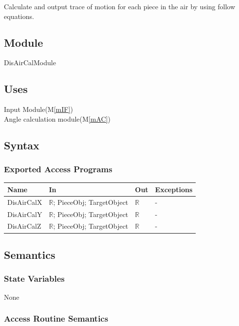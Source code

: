 \documentclass[12pt, titlepage]{article}
\newcommand{\mref}[1]{M\ref{#1}}
\begin{document}
Calculate and output trace of motion for each piece in the air by using follow equations.\\

\subsection{Module}

DisAirCalModule

\subsection{Uses}

Input Module(\mref{mIF})\\
Angle calculation module(\mref{mAC})\\

\subsection{Syntax}

\subsubsection{Exported Access Programs}

\begin{center}
	\begin{tabular}{p{2cm} p{4cm} p{4cm} p{2cm}}
		\hline
		\textbf{Name} & \textbf{In} & \textbf{Out} & \textbf{Exceptions} \\
		\hline
		DisAirCalX & $\mathbb{R}$; PieceObj; TargetObject & $\mathbb{R}$ & - \\
		DisAirCalY & $\mathbb{R}$; PieceObj; TargetObject & $\mathbb{R}$ & - \\
		DisAirCalZ & $\mathbb{R}$; PieceObj; TargetObject & $\mathbb{R}$ & - \\
		\hline
	\end{tabular}
\end{center}

\subsection{Semantics}

\subsubsection{State Variables}

None

\subsubsection{Access Routine Semantics}
\end{document}
